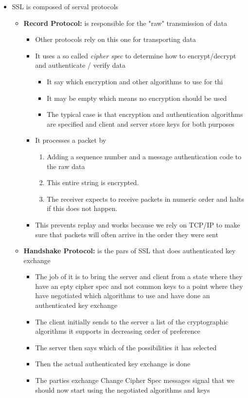 \documentclass[11pt]{article}
\begin{document}
\begin{itemize}
\item SSL is composed of serval protocols 
\begin{itemize}
\item \textbf{Record Protocol:} is responsible for the "raw" transmission of data
\begin{itemize}
\item Other protocols rely on this one for transporting data
\item It uses a so called \emph{cipher spec} to determine how to encrypt/decrypt and authenticate / verify data
\begin{itemize}
\item It say which encryption and other algorithms to use for thi
\item It may be empty which means no encryption should be used
\item The typical case is that encryption and authentication algorithms are specified and client and server store keys for both purposes
\end{itemize}
\item It processes a packet by
\begin{enumerate}
\item Adding a sequence number and a message authentication code to the raw data
\item This entire string is encrypted.
\item The receiver expects to receive packets in numeric order and halts if this does not happen.
\end{enumerate}
\end{itemize}
\begin{itemize}
\item This prevents replay and works because we rely on TCP/IP to make sure that packets will often arrive in the order they were sent
\end{itemize}

\item \textbf{Handshake Protocol:} is the pars of SSL that does authenticated key exchange
\begin{itemize}
\item The job of it is to bring the server and client from a state where they have an epty cipher spec and not common keys to a point where they have negotiated which algorithms to use and have done an authenticated key exchange
\item The client initially sends to the server a list of the cryptographic algorithms it supports in decreasing order of preference
\item The server then says which of the possibilities it has selected
\item Then the actual authenticated key exchange is done
\item The parties exchange Change Cipher Spec messages signal that we should now start using the negotiated algorithms and keys
\end{itemize}


\end{itemize}
\end{itemize}
\end{document}
